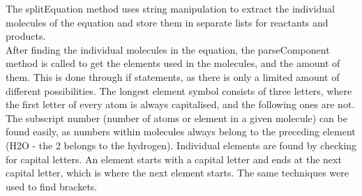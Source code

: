 \documentclass[a4paper,12pt]{article}
\begin{document}
The splitEquation method uses string manipulation to extract the individual molecules of the equation and store them in separate lists for reactants and products.\\
After finding the individual molecules in the equation, the parseComponent method is called to get the elements used in the molecules, and the amount of them. This is done through if statements, as there is only a limited amount of different possibilities. The longest element symbol consists of three letters, where the first letter of every atom is always capitalised, and the following ones are not. The subscript number (number of atoms or element in a given molecule) can be found easily, as numbers within molecules always belong to the preceding element (H2O - the 2 belongs to the hydrogen). Individual elements are found by checking for capital letters. An element starts with a capital letter and ends at the next capital letter, which is where the next element starts. The same techniques were used to find brackets.
\end{document}
